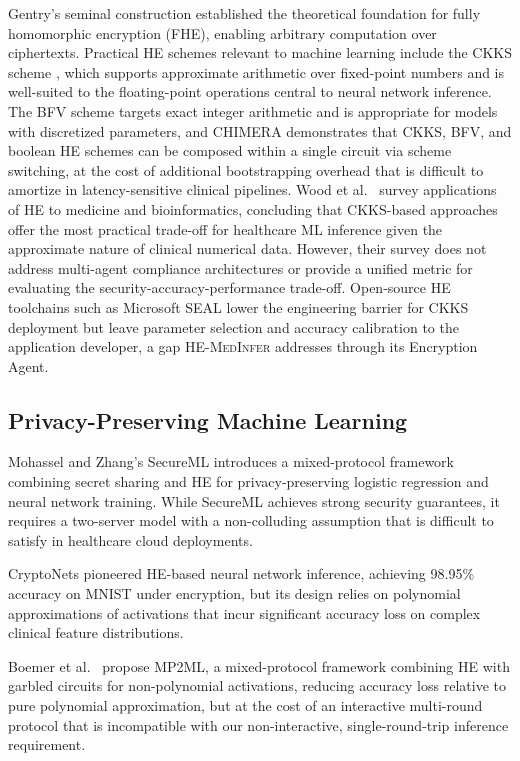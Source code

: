 \documentclass[journal,compsoc]{IEEEtran}
\newcommand{\framework}{\textsc{HE-MedInfer}}
\begin{document}
Gentry's seminal construction \cite{gentry2009fully} established the
theoretical foundation for fully homomorphic encryption (FHE), enabling
arbitrary computation over ciphertexts. Practical HE schemes relevant to
machine learning include the CKKS scheme \cite{cheon2017ckks}, which supports
approximate arithmetic over fixed-point numbers and is well-suited to the
floating-point operations central to neural network inference. The BFV scheme
\cite{fan2012bfv} targets exact integer arithmetic and is appropriate for
models with discretized parameters, and CHIMERA \cite{boura2018chimera}
demonstrates that CKKS, BFV, and boolean HE schemes can be composed within a
single circuit via scheme switching, at the cost of additional bootstrapping
overhead that is difficult to amortize in latency-sensitive clinical pipelines.
Wood et al.~\cite{wood2020homomorphic}
survey applications of HE to medicine and bioinformatics, concluding that
CKKS-based approaches offer the most practical trade-off for healthcare ML
inference given the approximate nature of clinical numerical data. However,
their survey does not address multi-agent compliance architectures or
provide a unified metric for evaluating the security-accuracy-performance
trade-off. Open-source HE toolchains such as Microsoft SEAL
\cite{seal2024} lower the engineering barrier for CKKS deployment but
leave parameter selection and accuracy calibration to the application
developer, a gap \framework{} addresses through its Encryption Agent.

\subsection{Privacy-Preserving Machine Learning}

Mohassel and Zhang's SecureML \cite{mohassel2017secureml} introduces
a mixed-protocol framework combining secret sharing and HE for privacy-preserving
logistic regression and neural network training. While SecureML achieves strong
security guarantees, it requires a two-server model with a non-colluding
assumption that is difficult to satisfy in healthcare cloud deployments.

CryptoNets \cite{gilad2016cryptonets} pioneered HE-based neural network
inference, achieving 98.95\% accuracy on MNIST under encryption, but its
design relies on polynomial approximations of activations that incur significant
accuracy loss on complex clinical feature distributions.

Boemer et al.~\cite{boemer2020mp2ml} propose MP2ML, a mixed-protocol framework combining
HE with garbled circuits for non-polynomial activations, reducing accuracy
loss relative to pure polynomial approximation, but at the cost of an
interactive multi-round protocol that is incompatible with our non-interactive,
single-round-trip inference requirement.
\end{document}
